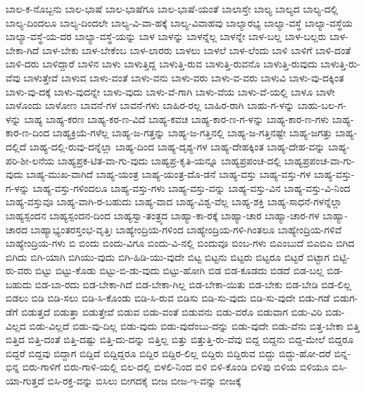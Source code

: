 {ಬಾಲ-ಕ-ನೊಬ್ಬನು
ಬಾಲ-ಭಾಷೆ
ಬಾಲ-ಭಾಷೆಗೂ
ಬಾಲ-ಭಾಷೆ-ಯಂತೆ
ಬಾಲಾಸ್ತೇ
ಬಾಲ್ಯ
ಬಾಲ್ಯದ
ಬಾಲ್ಯ-ದಲ್ಲಿ
ಬಾಲ್ಯ-ದಿಂದಲೂ
ಬಾಲ್ಯ-ದಿಂದಲೇ
ಬಾಲ್ಯ-ವಿ-ವಾ-ಹಕ್ಕೆ
ಬಾಲ್ಯ-ವಿವಾಹವು
ಬಾಲ್ಯಾರಭ್ಯ
ಬಾಲ್ಯಾ-ವಸ್ಥೆ
ಬಾಲ್ಯಾ-ವಸ್ಥೆಯ
ಬಾಲ್ಯಾ-ವಸ್ಥೆ-ಯ-ದರ
ಬಾಲ್ಯಾ-ವಸ್ಥೆ-ಯನ್ನು
ಬಾಳ
ಬಾಳನ್ನು
ಬಾಳನ್ನೆಲ್ಲ
ಬಾಳನ್ನೇ
ಬಾಳ-ಬಲ್ಲ
ಬಾಳ-ಬಲ್ಲರು
ಬಾಳ-ಬೇಕಾ-ಗಿದೆ
ಬಾಳ-ಬೇಕು
ಬಾಳ-ಬೇಕೆಂಬ
ಬಾಳ-ಲಾರರು
ಬಾಳಲು
ಬಾಳಲೆ
ಬಾಳ-ಲೆಂದು
ಬಾಳಿ
ಬಾಳಿಗೆ
ಬಾಳಿ-ದಂತೆ
ಬಾಳಿ-ದರು
ಬಾಳಿದ್ದಾರೆ
ಬಾಳಿನ
ಬಾಳು
ಬಾಳುತ್ತಿದ್ದ
ಬಾಳುತ್ತಿ-ರುವ
ಬಾಳುತ್ತಿ-ರುವನೊ
ಬಾಳುತ್ತಿ-ರುವುದು
ಬಾಳುತ್ತಿ-ರು-ವೆವು
ಬಾಳುತ್ತೇವೆ
ಬಾಳುವ
ಬಾಳು-ವಂತೆ
ಬಾಳು-ವನು
ಬಾಳು-ವರು
ಬಾಳು-ವ-ವರು
ಬಾಳುವಿ
ಬಾಳು-ವು-ದಕ್ಕಿಂತ
ಬಾಳು-ವು-ದಕ್ಕೆ
ಬಾಳು-ವುದನ್ನೇ
ಬಾಳು-ವುದು
ಬಾಳು-ವೆ-ಗಾಗಿ
ಬಾಳು-ವೆಯ
ಬಾಳು-ವೆ-ಯಲ್ಲಿ
ಬಾಳೂ
ಬಾಳೇ
ಬಾಳೊಂದು
ಬಾಳೋಣ
ಬಾವನೆ-ಗಳ
ಬಾವನೆ-ಗಳು
ಬಾಹಿರ-ರಲ್ಲ
ಬಾಹಿರ-ರಾಗಿ
ಬಾಹು-ಗ-ಳನ್ನು
ಬಾಹು-ಬಲ-ಗ-ಳನ್ನು
ಬಾಹ್ಯ
ಬಾಹ್ಯ-ಕರಣ
ಬಾಹ್ಯ-ಕರ-ಣ-ವಿದೆ
ಬಾಹ್ಯ-ಕವಚ
ಬಾಹ್ಯ-ಕಾರ-ಣ-ಗ-ಳನ್ನು
ಬಾಹ್ಯ-ಕಾರ-ಣ-ಗಳು
ಬಾಹ್ಯ-ಕಾರ-ಣ-ದಿಂದ
ಬಾಹ್ಯಕ್ರಿಯೆ-ಗಳೆಲ್ಲ
ಬಾಹ್ಯ-ಜ-ಗತ್ತನ್ನು
ಬಾಹ್ಯ-ಜ-ಗತ್ತಿನಲ್ಲಿ
ಬಾಹ್ಯ-ಜ-ಗತ್ತಿನಷ್ಟೇ
ಬಾಹ್ಯ-ಜಗತ್ತು
ಬಾಹ್ಯ-ದಲ್ಲಿದೆ
ಬಾಹ್ಯ-ದಲ್ಲಿ-ರುವು-ದನ್ನೆಲ್ಲಾ
ಬಾಹ್ಯ-ದಿಂದ
ಬಾಹ್ಯ-ದೃಶ್ಯ-ಗಳ
ಬಾಹ್ಯ-ದೇಹಕ್ಕಿಂತ
ಬಾಹ್ಯ-ದೇಹ-ವನ್ನು
ಬಾಹ್ಯ-ಪರಿ-ಶೀ-ಲನೆಯ
ಬಾಹ್ಯಪ್ರಕ-ಟಿತ-ವಾ-ಗು-ವುದು
ಬಾಹ್ಯಪ್ರ-ಕೃತಿ-ಯನ್ನೂ
ಬಾಹ್ಯಪ್ರಪಂಚ-ದಲ್ಲಿ
ಬಾಹ್ಯಪ್ರಪಂಚ-ವಾ-ಗು-ವುದು
ಬಾಹ್ಯ-ಮುಖ-ವಾಗಿದೆ
ಬಾಹ್ಯ-ಯಂತ್ರ
ಬಾಹ್ಯ-ಯಂತ್ರ-ದೊ-ಡನೆ
ಬಾಹ್ಯ-ವಸ್ತು
ಬಾಹ್ಯ-ವಸ್ತು-ಗಳ
ಬಾಹ್ಯ-ವಸ್ತು-ಗ-ಳನ್ನು
ಬಾಹ್ಯ-ವಸ್ತು-ಗಳಿಂದಲೂ
ಬಾಹ್ಯ-ವಸ್ತು-ಗಳು
ಬಾಹ್ಯ-ವಸ್ತು-ವನ್ನು
ಬಾಹ್ಯ-ವಸ್ತು-ವಿನ
ಬಾಹ್ಯ-ವಸ್ತು-ವಿ-ನಿಂದ
ಬಾಹ್ಯ-ವಸ್ತುವೂ
ಬಾಹ್ಯ-ವಾಗಿ-ರ-ಬಹುದು
ಬಾಹ್ಯ-ವಾದ
ಬಾಹ್ಯ-ವಿಶ್ವ-ವೆಲ್ಲ
ಬಾಹ್ಯ-ಶಕ್ತಿ
ಬಾಹ್ಯ-ಸಾಧನೆ-ಗಳನ್ನೆಲ್ಲಾ
ಬಾಹ್ಯಸ್ಪಂದನ
ಬಾಹ್ಯಸ್ಪಂದನ-ದಿಂದ
ಬಾಹ್ಯಸ್ವಾ-ತಂತ್ರ್ಯದ
ಬಾಹ್ಯಾ-ಕಾ-ರಕ್ಕೆ
ಬಾಹ್ಯಾ-ಚಾರ
ಬಾಹ್ಯಾ-ಚಾರ-ಗಳ
ಬಾಹ್ಯಾ-ಚಾರದ
ಬಾಹ್ಯಾಭ್ಯಂತರಸ್ತಂಭ-ವೃತ್ತಿಃ
ಬಾಹ್ಯೇಂದ್ರಿಯ-ಗಳಿಂದ
ಬಾಹ್ಯೇಂದ್ರಿಯ-ಗಳಿ-ಗಿಂತಲೂ
ಬಾಹ್ಯೇಂದ್ರಿಯ-ಗಳಿವೆ
ಬಾಹ್ಯೇಂದ್ರಿಯ-ಗಳು
ಬಿ
ಬಿಂದು
ಬಿಂದು-ವಿಗೂ
ಬಿಂದು-ವಿ-ನಲ್ಲಿ
ಬಿಂದುವೂ
ಬಿಂಬ-ಗಳು
ಬಿಎಂಬುದೆ
ಬಿಎಬಿಎ
ಬಿಗಿದ
ಬಿಗಿದು
ಬಿಗಿ-ಯಾಗಿ
ಬಿಗಿಯು-ವುದು
ಬಿಗಿ-ಹಿಡಿ-ಯು-ವುದೇ
ಬಿಟ್ಟ
ಬಿಟ್ಟನು
ಬಿಟ್ಟರು
ಬಿಟ್ಟರೂ
ಬಿಟ್ಟರೆ
ಬಿಟ್ಟಾಗ
ಬಿಟ್ಟಿ-ರು-ವರು
ಬಿಟ್ಟು
ಬಿಟ್ಟು-ಕೊಡು
ಬಿಟ್ಟು-ಬಿ-ಡು-ವುದು
ಬಿಟ್ಟು-ಹೋಗಿ
ಬಿಡ
ಬಿಡ-ಕೂಡದು
ಬಿಡದೆ
ಬಿಡ-ಬಲ್ಲ
ಬಿಡ-ಬಹುದು
ಬಿಡ-ಬಾ-ರದು
ಬಿಡ-ಬೇಕಾ-ಗಿದೆ
ಬಿಡ-ಬೇಕಾ-ಗಿಲ್ಲ
ಬಿಡ-ಬೇಕಾ-ಯಿತು
ಬಿಡ-ಬೇಕು
ಬಿಡ-ಬೇಡಿ
ಬಿಡ-ಲಿಲ್ಲ
ಬಿಡಲು
ಬಿಡಿ
ಬಿಡಿ-ಸಲು
ಬಿಡಿ-ಸಿ-ಕೊಂಡು
ಬಿಡಿ-ಸಿ-ರುವ
ಬಿಡಿಸು
ಬಿಡಿ-ಸು-ವುದು
ಬಿಡಿ-ಸು-ವುದೇ
ಬಿಡು-ಗಡೆ
ಬಿಡುಗ-ಡೆಗೆ
ಬಿಡುತ್ತದೆ
ಬಿಡುತ್ತಾ
ಬಿಡುತ್ತೇವೆ
ಬಿಡುವ
ಬಿಡು-ವಂತೆ
ಬಿಡುವನು
ಬಿಡು-ವರೊ
ಬಿಡುವಾಗ
ಬಿಡು-ವಿರಿ
ಬಿಡು-ವಿಲ್ಲದ
ಬಿಡು-ವಿಲ್ಲದೆ
ಬಿಡು-ವು-ದಿಲ್ಲ
ಬಿಡು-ವುದು
ಬಿಡು-ವುದೆಂಬು-ದನ್ನು
ಬಿಡು-ವುದೇ
ಬಿಡು-ವೆನು
ಬಿತ್ತ-ಬೇಕಾ
ಬಿತ್ತಿ
ಬಿತ್ತಿದ
ಬಿತ್ತಿ-ದಂತೆ
ಬಿತ್ತಿ-ದಷ್ಟು
ಬಿತ್ತಿ-ದು-ದನ್ನು
ಬಿತ್ತಿಲ್ಲ
ಬಿತ್ತು
ಬಿತ್ತುತ್ತಿ-ರು-ವೆವು
ಬಿದ್ದ
ಬಿದ್ದನು
ಬಿದ್ದ-ಮೇಲೆ
ಬಿದ್ದರೂ
ಬಿದ್ದರೆ
ಬಿದ್ದವು
ಬಿದ್ದಾಗ
ಬಿದ್ದಿದೆ
ಬಿದ್ದಿದ್ದರೂ
ಬಿದ್ದಿರ
ಬಿದ್ದಿರ-ಲಿಲ್ಲ
ಬಿದ್ದಿರು
ಬಿದ್ದಿರುವ
ಬಿದ್ದು
ಬಿದ್ದು-ಹೋ-ದರೆ
ಬಿನ್ನ-ಭಿನ್ನ
ಬಿರು-ಗಾಳಿಗೆ
ಬಿರು-ಗಾಳಿ-ಯಲ್ಲಿ
ಬಿಲ-ದಲ್ಲಿ
ಬಿಳಲಿ-ನಿಂದ
ಬಿಳಿ
ಬಿಳಿ-ಕೊಂಡಿ
ಬಿಳಿಪು
ಬಿಳಿಯ
ಬಿಳಿಯೂ
ಬಿಸಿ-ಯಾ-ಗುತ್ತದೆ
ಬಿಸಿ-ರಕ್ತ-ವನ್ನು
ಬಿಸಿಲು
ಬೀಗದಕೈ
ಬೀಜ
ಬೀಜ-ಇ-ವನ್ನು
ಬೀಜಕ್ಕೆ
}
